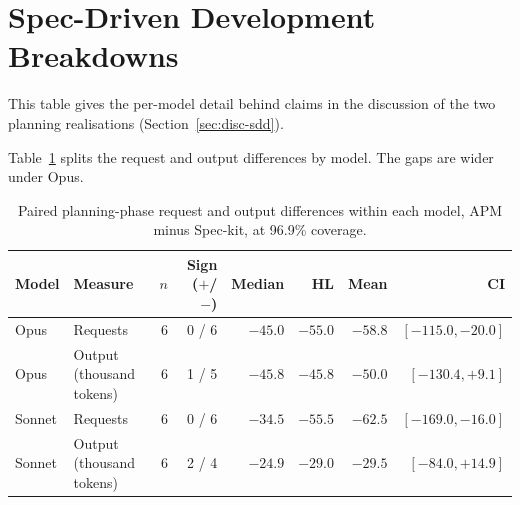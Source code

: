 
\section{Spec-Driven Development Breakdowns}
\label{app:sdd-breakdowns}

This table gives the per-model detail behind claims in the discussion of the two planning realisations (Section~\ref{sec:disc-sdd}).

Table~\ref{tab:planning-behaviour-model} splits the request and output differences by model. The gaps are wider under Opus.

\begin{table}[H]
  \centering
  \caption{Paired planning-phase request and output differences within each model, APM minus Spec-kit, at 96.9\% coverage.}
  \label{tab:planning-behaviour-model}
  \begin{tabular}{llrrrrrr}
    \toprule
    Model & Measure & $n$ & Sign ($+$/$-$) & Median & HL & Mean & CI \\
    \midrule
    Opus & Requests & 6 & 0 / 6 & $-45.0$ & $-55.0$ & $-58.8$ & $[-115.0, -20.0]$ \\
    Opus & Output (thousand tokens) & 6 & 1 / 5 & $-45.8$ & $-45.8$ & $-50.0$ & $[-130.4, +9.1]$ \\
    Sonnet & Requests & 6 & 0 / 6 & $-34.5$ & $-55.5$ & $-62.5$ & $[-169.0, -16.0]$ \\
    Sonnet & Output (thousand tokens) & 6 & 2 / 4 & $-24.9$ & $-29.0$ & $-29.5$ & $[-84.0, +14.9]$ \\
    \bottomrule
  \end{tabular}
\end{table}
